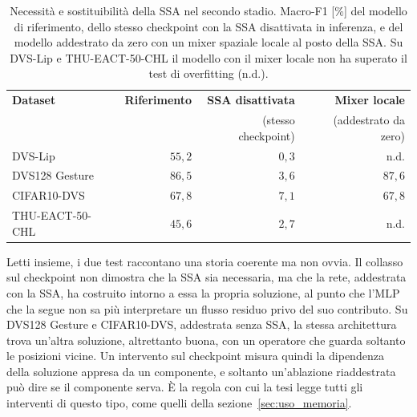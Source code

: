 \begin{table}[t]
\centering
\small
\renewcommand{\arraystretch}{1.2}
\caption[Necessità e sostituibilità della SSA nel secondo stadio]{Necessità e sostituibilità della SSA nel secondo stadio. Macro-F1 [\%] del modello di riferimento, dello stesso checkpoint con la SSA disattivata in inferenza, e del modello addestrato da zero con un mixer spaziale locale al posto della SSA. Su DVS-Lip e THU-EACT-50-CHL il modello con il mixer locale non ha superato il test di overfitting (n.d.).}
\label{tab:ssa_secondo_stadio}
\begin{tabular}{@{}l r r r@{}}
\hline
\textbf{Dataset} & \textbf{Riferimento} & \textbf{SSA disattivata} & \textbf{Mixer locale} \\
 & & {\footnotesize(stesso checkpoint)} & {\footnotesize(addestrato da zero)} \\
\hline
DVS-Lip & $55{,}2$ & $0{,}3$ & n.d. \\
DVS128 Gesture & $86{,}5$ & $3{,}6$ & $87{,}6$ \\
CIFAR10-DVS & $67{,}8$ & $7{,}1$ & $67{,}8$ \\
THU-EACT-50-CHL & $45{,}6$ & $2{,}7$ & n.d. \\
\hline
\end{tabular}
\end{table}

Letti insieme, i due test raccontano una storia coerente ma non ovvia. Il collasso sul checkpoint non dimostra che la SSA sia necessaria, ma che la rete, addestrata con la SSA, ha costruito intorno a essa la propria soluzione, al punto che l'MLP che la segue non sa più interpretare un flusso residuo privo del suo contributo. Su DVS128 Gesture e CIFAR10-DVS, addestrata senza SSA, la stessa architettura trova un'altra soluzione, altrettanto buona, con un operatore che guarda soltanto le posizioni vicine. Un intervento sul checkpoint misura quindi la dipendenza della soluzione appresa da un componente, e soltanto un'ablazione riaddestrata può dire se il componente serva. È la regola con cui la tesi legge tutti gli interventi di questo tipo, come quelli della sezione~\ref{sec:uso_memoria}.

